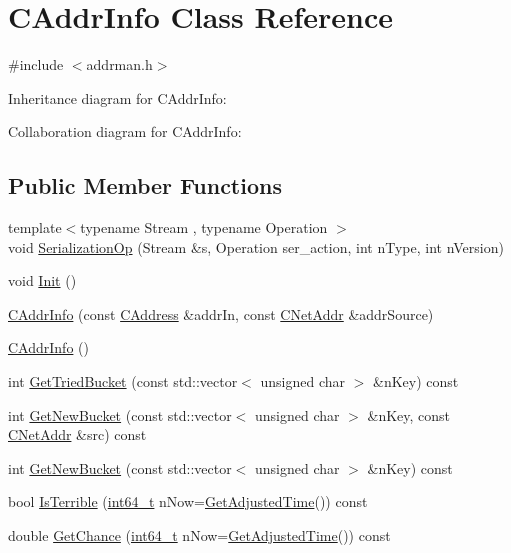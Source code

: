 \hypertarget{class_c_addr_info}{}\section{C\+Addr\+Info Class Reference}
\label{class_c_addr_info}


{\ttfamily \#include $<$addrman.\+h$>$}



Inheritance diagram for C\+Addr\+Info\+:


Collaboration diagram for C\+Addr\+Info\+:
\subsection*{Public Member Functions}
\begin{DoxyCompactItemize}
\item 
{\footnotesize template$<$typename Stream , typename Operation $>$ }\\void \hyperlink{class_c_addr_info_ae80fdec7d3b48278033ea2280f66e68b}{Serialization\+Op} (Stream \&s, Operation ser\+\_\+action, int n\+Type, int n\+Version)
\item 
void \hyperlink{class_c_addr_info_af1df1f12bc71ed7f3debae61058b9b9f}{Init} ()
\item 
\hyperlink{class_c_addr_info_a27e773233e8d7e7d183f138d24cc40ef}{C\+Addr\+Info} (const \hyperlink{class_c_address}{C\+Address} \&addr\+In, const \hyperlink{class_c_net_addr}{C\+Net\+Addr} \&addr\+Source)
\item 
\hyperlink{class_c_addr_info_ae14c3a91bb669e5580be1d3767264187}{C\+Addr\+Info} ()
\item 
int \hyperlink{class_c_addr_info_a3732720a8d657d1dc8163e896cc480b4}{Get\+Tried\+Bucket} (const std\+::vector$<$ unsigned char $>$ \&n\+Key) const 
\item 
int \hyperlink{class_c_addr_info_ae53c2174bdbc070bb1777cfabecaddda}{Get\+New\+Bucket} (const std\+::vector$<$ unsigned char $>$ \&n\+Key, const \hyperlink{class_c_net_addr}{C\+Net\+Addr} \&src) const 
\item 
int \hyperlink{class_c_addr_info_adf33262ab64918de67ac6c2175faab86}{Get\+New\+Bucket} (const std\+::vector$<$ unsigned char $>$ \&n\+Key) const 
\item 
bool \hyperlink{class_c_addr_info_a1fd74c1bd7a8eb3c234bf222f028e94c}{Is\+Terrible} (\hyperlink{stdint_8h_adec1df1b8b51cb32b77e5b86fff46471}{int64\+\_\+t} n\+Now=\hyperlink{timedata_8h_a09f81b9c7650f898cf3cf305b87547e6}{Get\+Adjusted\+Time}()) const 
\item 
double \hyperlink{class_c_addr_info_a264f9856d499cf077aa5c82327302307}{Get\+Chance} (\hyperlink{stdint_8h_adec1df1b8b51cb32b77e5b86fff46471}{int64\+\_\+t} n\+Now=\hyperlink{timedata_8h_a09f81b9c7650f898cf3cf305b87547e6}{Get\+Adjusted\+Time}()) const 
\end{DoxyCompactItemize}
